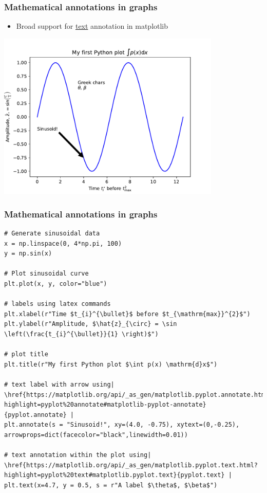 \documentclass[xcolor=table]{beamer}
\begin{document}
\begin{frame}[fragile]
\frametitle{Mathematical annotations in graphs}
    \begin{itemize}
        \item Broad support for \href{https://matplotlib.org/users/text_intro.html}{text} annotation in matplotlib
    \end{itemize}
\begin{center}
	\includegraphics[width=0.8\textwidth]{plot_text_annotate.pdf}
\end{center}
\end{frame}
            
            
\begin{frame}[fragile]
    \tiny
\frametitle{Mathematical annotations in graphs}
            \begin{lstlisting}[style=python]
# Generate sinusoidal data
x = np.linspace(0, 4*np.pi, 100)
y = np.sin(x)

# Plot sinusoidal curve
plt.plot(x, y, color="blue")

# labels using latex commands 
plt.xlabel(r"Time $t_{i}^{\bullet}$ before $t_{\mathrm{max}}^{2}$")
plt.ylabel(r"Amplitude, $\hat{z}_{\circ} = \sin \left(\frac{t_{i}^{\bullet}}{1} \right)$")

# plot title
plt.title(r"My first Python plot $\int p(x) \mathrm{d}x$") 

# text label with arrow using| \href{https://matplotlib.org/api/_as_gen/matplotlib.pyplot.annotate.html?highlight=pyplot%20annotate#matplotlib-pyplot-annotate}{pyplot.annotate} | 
plt.annotate(s = "Sinusoid!", xy=(4.0, -0.75), xytext=(0,-0.25), arrowprops=dict(facecolor="black",linewidth=0.01))

# text annotation within the plot using| \href{https://matplotlib.org/api/_as_gen/matplotlib.pyplot.text.html?highlight=pyplot%20text#matplotlib.pyplot.text}{pyplot.text} |
plt.text(x=4.7, y = 0.5, s = r"A label $\theta$, $\beta$")
\end{lstlisting}
\end{frame}
    
\end{document}
